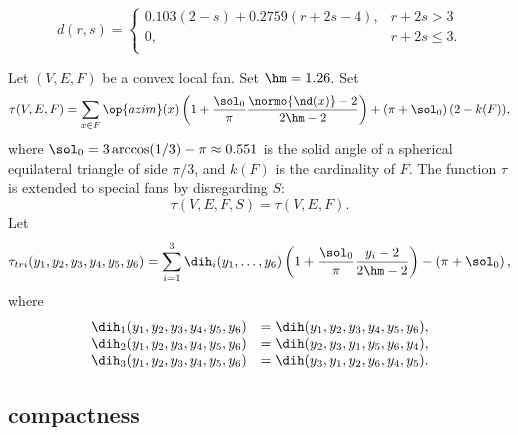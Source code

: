\begin{definition}[d]
\begin{displaymath}d(r,s) = \begin{cases}
0.103 (2-s) + 0.2759 (r+2s-4), & r + 2s > 3\\
0, & r + 2s \le 3.\\
\end{cases}\end{displaymath}
\end{definition}

\begin{definition}\label{def:tau}
Let $(V,E,F)$ be a convex local fan.  Set $\hm = 1.26$.  Set
\begin{displaymath}
  \tau(V,E,F) =\sum_{x\in F} \op{azim}(x)\left(1 + \dfrac{\sol_0}{\pi}  
    \dfrac{\normo{\nd(x)}-2}{2\hm-2}\right) 
+ \left(\pi+{\sol_0}\right) (2- k(F)),
\end{displaymath}
where $\sol_0=3\arccos(1/3)-\pi\approx0.551$ is the solid angle of a
spherical equilateral triangle of side $\pi/3$, and $k(F)$ is the
cardinality of $F$.  The function $\tau$ is extended to special fans by
disregarding $S$:
\begin{displaymath}
\tau(V,E,F,S) = \tau(V,E,F).
\end{displaymath}
Let 
\begin{displaymath}
  \tau_{tri}(y_1,y_2,y_3,y_4,y_5,y_6) =
  \sum_{i=1}^3 \dih_i(y_1,\ldots,y_6)
\left(1 + \dfrac{\sol_0}{\pi}  \dfrac{y_i -2}{2\hm-2}\right) 
- \left(\pi+{\sol_0}\right),
\end{displaymath}
where
\begin{displaymath}
\begin{array}{lll}
\dih_1(y_1,y_2,y_3,y_4,y_5,y_6) &= \dih(y_1,y_2,y_3,y_4,y_5,y_6),\\
\dih_2(y_1,y_2,y_3,y_4,y_5,y_6) &= \dih(y_2,y_3,y_1,y_5,y_6,y_4),\\
\dih_3(y_1,y_2,y_3,y_4,y_5,y_6) &= \dih(y_3,y_1,y_2,y_6,y_4,y_5).\\
\end{array}
\end{displaymath}
\end{definition}



\subsection{compactness}

